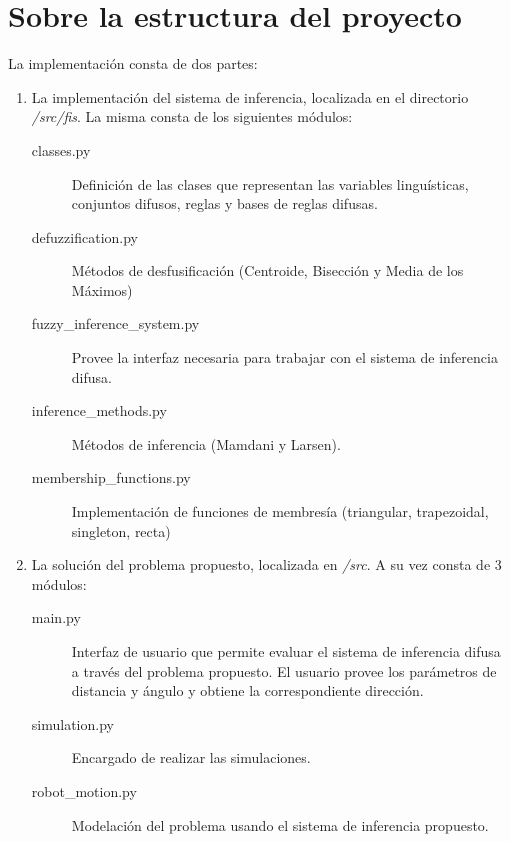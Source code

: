 \documentclass[a4paper,10pt]{article}
\begin{document}
\section{Sobre la estructura del proyecto}\label{sec:5}
	La implementación consta de dos partes:
	\begin{enumerate}
	\item{La implementación del sistema de inferencia, localizada en el directorio \emph{/src/fis}. La misma consta de los siguientes módulos:
	\begin{description}
		\item[classes.py] Definición de las clases que representan las variables linguísticas, conjuntos difusos, reglas y bases de reglas difusas.
		\item[defuzzification.py] Métodos de desfusificación (Centroide, Bisección y Media de los Máximos)
		\item[fuzzy\_inference\_system.py] Provee la interfaz necesaria para trabajar con el sistema de inferencia difusa.
		\item[inference\_methods.py] Métodos de inferencia (Mamdani y Larsen).
		\item[membership\_functions.py] Implementación de funciones de membresía (triangular, trapezoidal, singleton, recta)	 
	\end{description}}
	\item{La solución del problema propuesto, localizada en \emph{/src}. A su vez consta de 3 módulos:
	\begin{description}
		\item[main.py] Interfaz de usuario que permite evaluar el sistema de inferencia difusa a través del problema propuesto. El usuario provee los parámetros de distancia y ángulo y obtiene la correspondiente dirección.
		\item[simulation.py] Encargado de realizar las simulaciones.
		\item[robot\_motion.py] Modelación del problema usando el sistema de inferencia propuesto.
	\end{description}}
	\end{enumerate}	


\label{end}
\end{document}
